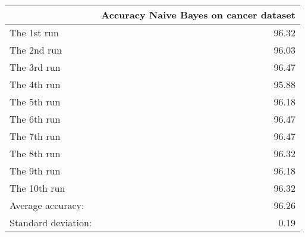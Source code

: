 \begin{tabular}{lr}
\toprule
{} &  Accuracy Naive Bayes on cancer dataset \\
\midrule
The 1st run         &                                   96.32 \\
The 2nd run         &                                   96.03 \\
The 3rd run         &                                   96.47 \\
The 4th run         &                                   95.88 \\
The 5th run         &                                   96.18 \\
The 6th run         &                                   96.47 \\
The 7th run         &                                   96.47 \\
The 8th run         &                                   96.32 \\
The 9th run         &                                   96.18 \\
The 10th run        &                                   96.32 \\
Average accuracy:   &                                   96.26 \\
Standard deviation: &                                    0.19 \\
\bottomrule
\end{tabular}
